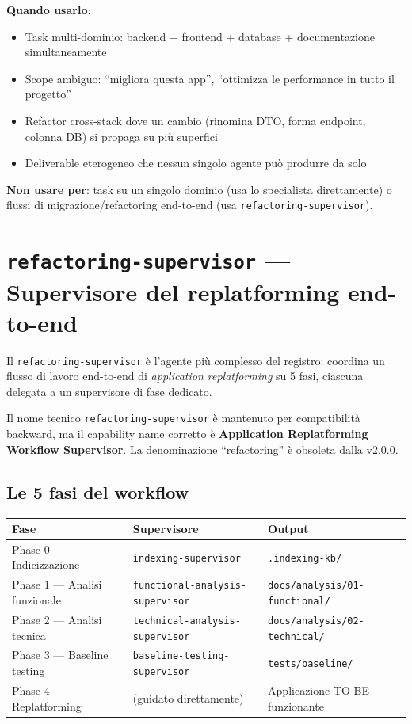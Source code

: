 \documentclass[12pt,a4paper,twoside]{book}
\begin{document}
\textbf{Quando usarlo}:
\begin{itemize}
  \item Task multi-dominio: backend + frontend + database + documentazione simultaneamente
  \item Scope ambiguo: ``migliora questa app'', ``ottimizza le performance in tutto il progetto''
  \item Refactor cross-stack dove un cambio (rinomina DTO, forma endpoint, colonna DB) si propaga su più superfici
  \item Deliverable eterogeneo che nessun singolo agente può produrre da solo
\end{itemize}

\textbf{Non usare per}: task su un singolo dominio (usa lo specialista direttamente) o flussi di migrazione/refactoring end-to-end (usa \texttt{refactoring-supervisor}).

\section{\texttt{refactoring-supervisor} — Supervisore del replatforming end-to-end}

Il \texttt{refactoring-supervisor} è l'agente più complesso del registro: coordina un flusso di lavoro end-to-end di \textit{application replatforming} su 5 fasi, ciascuna delegata a un supervisore di fase dedicato.

\begin{notabox}
Il nome tecnico \texttt{refactoring-supervisor} è mantenuto per compatibilità backward, ma il capability name corretto è \textbf{Application Replatforming Workflow Supervisor}. La denominazione ``refactoring'' è obsoleta dalla v2.0.0.
\end{notabox}

\subsection{Le 5 fasi del workflow}

\begin{center}
\begin{tabular}{lll}
\toprule
\textbf{Fase} & \textbf{Supervisore} & \textbf{Output} \\
\midrule
Phase 0 — Indicizzazione & \texttt{indexing-supervisor} & \texttt{.indexing-kb/} \\
Phase 1 — Analisi funzionale & \texttt{functional-analysis-supervisor} & \texttt{docs/analysis/01-functional/} \\
Phase 2 — Analisi tecnica & \texttt{technical-analysis-supervisor} & \texttt{docs/analysis/02-technical/} \\
Phase 3 — Baseline testing & \texttt{baseline-testing-supervisor} & \texttt{tests/baseline/} \\
Phase 4 — Replatforming & (guidato direttamente) & Applicazione TO-BE funzionante \\
\bottomrule
\end{tabular}
\end{center}
\end{document}
